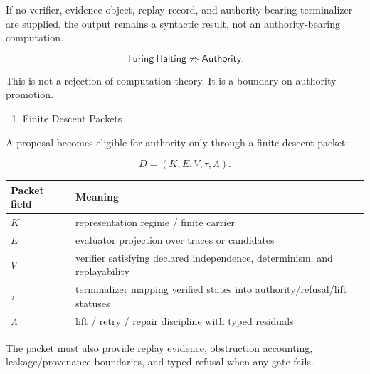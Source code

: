 \documentclass[
  10pt,
]{article}
\providecommand{\tightlist}{%
  \setlength{\itemsep}{0pt}\setlength{\parskip}{0pt}}
\providecommand{\tightlist}{%
  \setlength{\itemsep}{0pt}\setlength{\parskip}{0pt}}
\begin{document}
If no verifier, evidence object, replay record, and authority-bearing terminalizer are supplied, the output remains a syntactic result, not an authority-bearing computation.

\protect\hypertarget{math-E0025-0031}{}{\[
\boxed{
\mathsf{Turing\ Halting}
\not\Rightarrow
\mathsf{Authority}.
}
\]}

This is not a rejection of computation theory. It is a boundary on authority promotion.

\begin{enumerate}
\def\labelenumi{\arabic{enumi}.}
\setcounter{enumi}{2}
\tightlist
\item
  Finite Descent Packets
\end{enumerate}

A proposal becomes eligible for authority only through a finite descent packet:

\protect\hypertarget{math-E0026-0032}{}{\[
D=(K,E,V,\tau,\Lambda).
\]}

\begin{longtable}[]{@{}
  >{\raggedright\arraybackslash}p{}
  >{\raggedright\arraybackslash}p{}@{}}
\toprule\noalign{}
\begin{minipage}[b]{\linewidth}\raggedright
Packet field
\end{minipage} & \begin{minipage}[b]{\linewidth}\raggedright
Meaning
\end{minipage} \\
\midrule\noalign{}
\endhead
\bottomrule\noalign{}
\endlastfoot
\protect\hypertarget{math-E0027-0033}{}{\(K\)} & representation regime / finite carrier \\
\protect\hypertarget{math-E0028-0034}{}{\(E\)} & evaluator projection over traces or candidates \\
\protect\hypertarget{math-E0012-0035}{}{\(V\)} & verifier satisfying declared independence, determinism, and replayability \\
\protect\hypertarget{math-E0014-0036}{}{\(\tau\)} & terminalizer mapping verified states into authority/refusal/lift statuses \\
\protect\hypertarget{math-E0029-0037}{}{\(\Lambda\)} & lift / retry / repair discipline with typed residuals \\
\end{longtable}

The packet must also provide replay evidence, obstruction accounting, leakage/provenance boundaries, and typed refusal when any gate fails.
\end{document}
